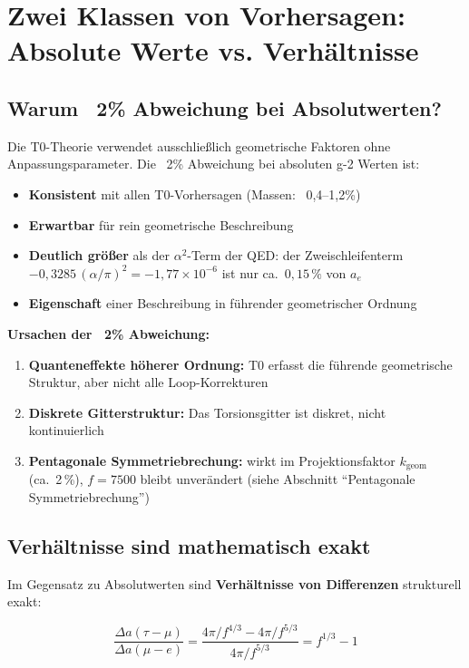	\section{Zwei Klassen von Vorhersagen: Absolute Werte vs. Verhältnisse}
	
	\subsection{Warum ~2\% Abweichung bei Absolutwerten?}
	
	Die T0-Theorie verwendet ausschließlich geometrische Faktoren ohne Anpassungsparameter. Die ~2\% Abweichung bei absoluten g-2 Werten ist:
	
	\begin{itemize}
		\item \textbf{Konsistent} mit allen T0-Vorhersagen (Massen: ~0{,}4--1{,}2\%)
		\item \textbf{Erwartbar} für rein geometrische Beschreibung
		\item \textbf{Deutlich größer} als der $\alpha^2$-Term der QED: der Zweischleifenterm $-0{,}3285\,(\alpha/\pi)^2 = -1{,}77 \times 10^{-6}$ ist nur ca.\ $0{,}15\,\%$ von $a_e$
		\item \textbf{Eigenschaft} einer Beschreibung in führender geometrischer Ordnung
	\end{itemize}
	
	\textbf{Ursachen der ~2\% Abweichung:}
	\begin{enumerate}
		\item \textbf{Quanteneffekte höherer Ordnung:} T0 erfasst die führende geometrische Struktur, aber nicht alle Loop-Korrekturen
		\item \textbf{Diskrete Gitterstruktur:} Das Torsionsgitter ist diskret, nicht kontinuierlich
		\item \textbf{Pentagonale Symmetriebrechung:} wirkt im Projektionsfaktor $k_\text{geom}$ (ca.\ 2\,\%), $f = 7500$ bleibt unverändert (siehe Abschnitt \enquote{Pentagonale Symmetriebrechung})
	\end{enumerate}
	
	\subsection{Verhältnisse sind mathematisch exakt}
	
	Im Gegensatz zu Absolutwerten sind \textbf{Verhältnisse von Differenzen} strukturell exakt:
	
	\begin{equation}
		\frac{\Delta a(\tau - \mu)}{\Delta a(\mu - e)} = \frac{4\pi/f^{4/3} - 4\pi/f^{5/3}}{4\pi/f^{5/3}} = f^{1/3} - 1
	\end{equation}
	
